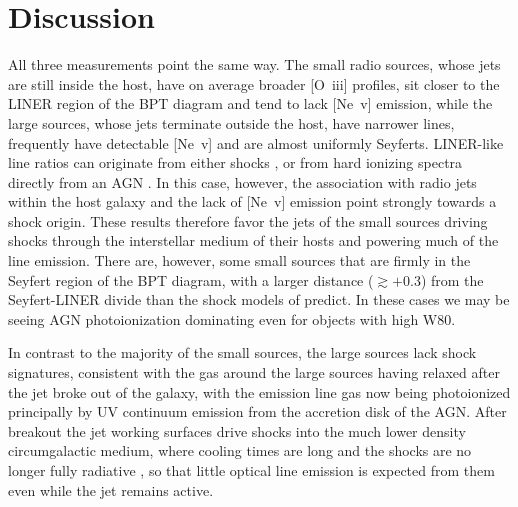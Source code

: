 \documentclass[linenumbers,trackchanges]{aastex701}
\begin{document}
\section{Discussion}
All three measurements point the same way. The small radio sources, whose jets are still inside the host, have on average broader [O~{\sc iii}] profiles, sit closer to the LINER region of the BPT diagram and tend to lack [Ne~{\sc v}] emission, while the large sources, whose jets terminate outside the host, have narrower lines, frequently have detectable [Ne~{\sc v}] and are almost uniformly Seyferts. LINER-like line ratios can originate from either shocks \citep[both through direct shock heating and by photoionization by post-shock gas e.g.][]{Allen08}, or from hard ionizing spectra directly from an AGN \citep[e.g.][]{kewley2006}. In this case, however, the association with radio jets within the host galaxy and the lack of [Ne~{\sc v}] emission point strongly towards a shock origin. These results therefore favor the jets of the small sources driving shocks through the interstellar medium of their hosts and powering much of the line emission. There are, however, some small sources that are firmly in the Seyfert region of the BPT diagram, with a larger distance ($\gtrsim +0.3$) from the Seyfert-LINER divide than the shock models of \citet{Allen08} predict. In these cases we may be seeing AGN photoionization dominating even for objects with high W80. 

In contrast to the majority of the small sources, the large sources lack shock signatures, consistent with the gas around the large sources having relaxed after the jet broke out of the galaxy, with the emission line gas now being photoionized principally by UV continuum emission from the accretion disk of the AGN. After breakout the jet working surfaces drive shocks into the much lower density circumgalactic medium, where cooling times are long and the shocks are no longer fully radiative \citep[e.g.][]{dopita03}, so that little optical line emission is expected from them even while the jet remains active.
\end{document}
